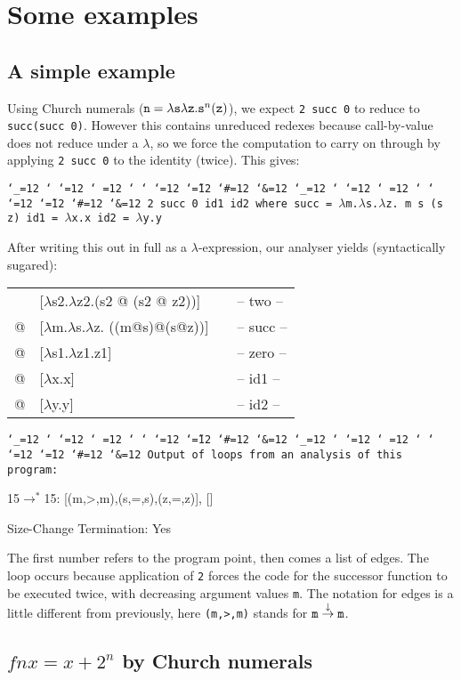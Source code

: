 \documentclass{LMCS}
\makeatletter
\newcommand{\fl}{\noindent}
\newcommand{\hair}{\hspace{2mm}}
\newcommand{\bt}{\begin{tabular}}
\newcommand{\et}{\end{tabular}}
\newcommand{\bp}{\begin{program}\small}
\newcommand{\ep}{\end{program}}
\newcommand{\programenvironment}{\programmode \def\par{\leavevmode\endgraf}\obeylines\nobreak \programmode}
\newcommand{\programmode}{\tt \catcode`\_=12 \catcode`\?=12 \catcode`\.=12 \catcode`\,=12
	\catcode`\;=12 \catcode`\:=12 \catcode`\@=12 \catcode`\~=12
        \catcode`\#=12 \catcode`\&=12      \obeyspaces\frenchspacing}
\newenvironment{programintext}{\programenvironment}{}
\newenvironment{program}{\setlength{\partopsep}{0mm}\setlength{\topsep}{0mm}
	\begin{trivlist}\item[]
\hspace*{5mm}\begin{minipage}{1.0\textwidth}
\vspace{1mm}
	\begin{programintext}
	}{\end{programintext}
	\vspace{1mm}
	\end{minipage}
	\end{trivlist}
	\noindent}
\theoremstyle{definition}\newtheorem{env}[thm]{Environment}
\makeatother
\begin{document}
\section{Some examples} \label{sec:examples}

\subsection{A simple example}

\fl Using Church numerals 
(${\tt n} = \lambda{\tt s}\lambda{\tt z.s}^n({\tt z})$), 
we expect {\tt 2 succ 0} to reduce to {\tt 
succ(succ 0)}. However this  contains unreduced redexes because 
call-by-value does not reduce under a $\lambda$, so we force the 
computation to carry on through by applying {\tt 2 succ 0} to the 
identity (twice). This gives:

\bp
2 succ 0 id1 id2 where
  succ = $\lambda$m.$\lambda$s.$\lambda$z. m s (s z)
  id1  = $\lambda$x.x
  id2  = $\lambda$y.y

\ep
After writing this out in full as a $\lambda$-expression, our 
analyser yields (syntactically sugared):\medskip

{\tt\bt{llll}
      &[$\lambda$s2.$\lambda$z2.(s2 @ (s2 @ z2))] &\hair& -- two --\\
   @ & [$\lambda$m.$\lambda$s.$\lambda$z. \fbox{15:}((m@s)@(s@z))] && -- succ 
   --\\
   @ & [$\lambda$s1.$\lambda$z1.z1]   &&  -- zero --\\
   @ & [$\lambda$x.x]                 && -- id1 --\\
   @ & [$\lambda$y.y]                 && -- id2 --
   \et}

\bp
Output of loops from an analysis of this program:

15$\to^* $15: [(m,>,m),(s,=,s),(z,=,z)], []

Size-Change Termination: Yes

\ep
The first number refers to the program point,
then comes a list of edges. 
The loop occurs because application of {\tt 2} forces the code for 
the successor function to be executed twice, with decreasing argument 
values {\tt m}. The notation for edges is a little
different from previously, here {\tt (m,>,m)} stands for
${\tt m}\stackrel{\downarrow}{\to}{\tt m}$.



\subsection{ $f n x = x + 2^n$ by Church numerals}\label{ex:fnx}
\end{document}
